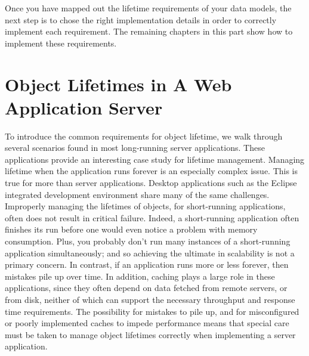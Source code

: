 Once you have mapped out the lifetime requirements of your data models, the next
step is to chose the right implementation details in order to correctly implement
each requirement. The remaining chapters in this part show how to implement these
requirements.



\section{Object Lifetimes in A Web Application Server}


To introduce the common requirements for object lifetime, we walk through several
scenarios found in most long-running server applications. These applications
provide an interesting case study for lifetime management. Managing lifetime when
the application runs forever is an especially complex issue. This is true for
more than server applications. Desktop applications such as the Eclipse
integrated development environment share many of the same challenges. Improperly managing
the lifetimes of objects, for short-running applications, often does not result
in critical failure. Indeed, a short-running application often finishes its run
before one would even notice a problem with memory consumption. Plus, you
probably don't run many instances of a short-running application simultaneously; and so
achieving the ultimate in scalability is not a primary concern. In contrast, if
an application runs more or less forever, then mistakes pile up over time. In
addition, caching plays a large role in these applications, since they often
depend on data fetched from remote servers, or from disk, neither of which can
support the necessary throughput and response time requirements. The possibility
for mistakes to pile up, and for misconfigured or poorly implemented caches to impede
performance means that special care must be taken to manage object lifetimes
correctly when implementing a server application.

